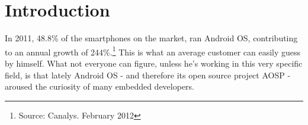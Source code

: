 
\section{Introduction}
In 2011, 48.8\% of the smartphones on the market, ran Android OS, contributing to an annual growth of 244\%.\footnote{Source: Canalys. February 2012} This is what an average customer can easily guess by himself. What not everyone can figure, unless he's working in this very specific field, is that lately Android OS - and therefore its open source project AOSP - aroused the curiosity of many embedded developers.